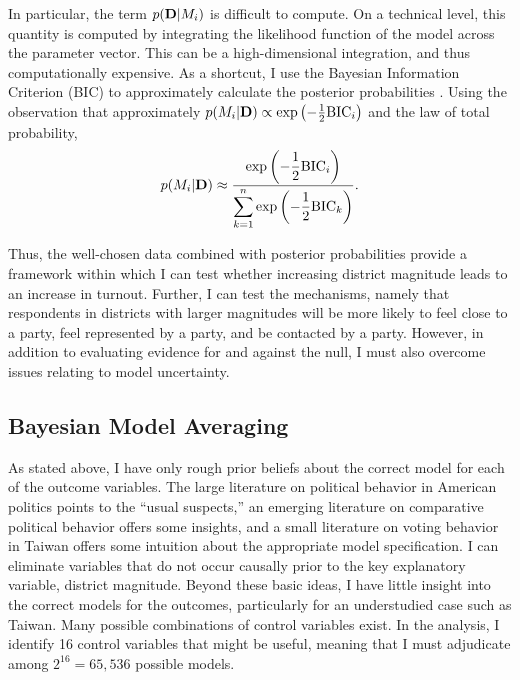 \documentclass[12pt]{article}
\begin{document}
In particular, the term $p({\bf D} | M_i)$ is difficult to compute. On a technical level, this quantity is computed by integrating the likelihood function of the model across the parameter vector. This can be a high-dimensional integration, and thus computationally expensive. As a shortcut, I use the Bayesian Information Criterion (BIC) to approximately calculate the posterior probabilities \citep{Raftery1995, KassRaftery1995}. Using the observation that approximately $p(M_i | {\bf D}) \propto \text{exp} \left( -\frac{1}{2}\text{BIC}_i \right)$ and the law of total probability,  
\begin{equation}\nonumber
p(M_i | {\bf D}) \approx \dfrac{\text{exp} \left( -\dfrac{1}{2}\text{BIC}_i \right)}{\displaystyle \sum_{k = 1}^n \text{exp} \left( -\dfrac{1}{2}\text{BIC}_k \right)}\text{.}
\end{equation}

Thus, the well-chosen data combined with posterior probabilities provide a framework within which I can test whether increasing district magnitude leads to an increase in turnout. Further, I can test the mechanisms, namely that respondents in districts with larger magnitudes will be more likely to feel close to a party, feel represented by a party, and be contacted by a party. However, in addition to evaluating evidence for  and against the null, I must also overcome issues relating to model uncertainty.

\subsection*{Bayesian Model Averaging} 

As stated above, I have only rough prior beliefs about the correct model for each of the outcome variables. The large literature on political behavior in American politics points to the ``usual suspects,'' an emerging literature on comparative political behavior offers some insights, and a small literature on voting behavior in Taiwan offers some intuition about the appropriate model specification. I can eliminate variables that do not occur causally prior to the key explanatory variable, district magnitude. Beyond these basic ideas, I have little insight into the correct models for the outcomes, particularly for an understudied case such as Taiwan. Many possible combinations of control variables exist. In the analysis, I identify 16 control variables that might be useful, meaning that I must adjudicate among $2^{16} = 65,536$ possible models.
\end{document}
